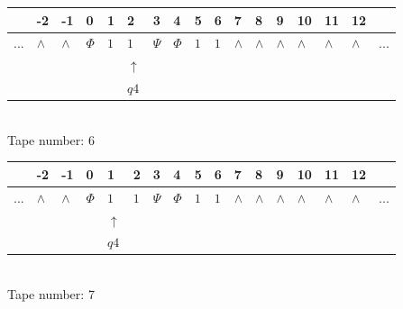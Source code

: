 \documentclass[11pt]{article}
\begin{document}
\begin{table}[H]
\centering
\begin{tabular}{lllllllllllllllll}
 & -2 & -1 & 0 & 1 & 2 & 3 & 4 & 5 & 6 & 7 & 8 & 9 & 10 & 11 & 12 & \\
\hline
$...$ & \multicolumn{1}{|l|}{$\wedge$} & \multicolumn{1}{|l|}{$\wedge$} & \multicolumn{1}{|l|}{$\Phi$} & \multicolumn{1}{|l|}{$1$} & \multicolumn{1}{|l|}{$1$} & \multicolumn{1}{|l|}{$\Psi$} & \multicolumn{1}{|l|}{$\Phi$} & \multicolumn{1}{|l|}{$1$} & \multicolumn{1}{|l|}{$1$} & \multicolumn{1}{|l|}{$\wedge$} & \multicolumn{1}{|l|}{$\wedge$} & \multicolumn{1}{|l|}{$\wedge$} & \multicolumn{1}{|l|}{$\wedge$} & \multicolumn{1}{|l|}{$\wedge$} & \multicolumn{1}{|l|}{$\wedge$} & $...$\\
\hline
&  &  &  &  & $\uparrow$ &  &  &  &  &  &  &  &  &  &  &  \\
&  &  &  &  & $ q4 $ &  &  &  &  &  &  &  &  &  &  &  \\
\end{tabular}
\\
Tape number: 6
\noindent\makebox[\linewidth]{\hdashrule{\textwidth}{1pt}{1pt}}\end{table}

\begin{table}[H]
\centering
\begin{tabular}{lllllllllllllllll}
 & -2 & -1 & 0 & 1 & 2 & 3 & 4 & 5 & 6 & 7 & 8 & 9 & 10 & 11 & 12 & \\
\hline
$...$ & \multicolumn{1}{|l|}{$\wedge$} & \multicolumn{1}{|l|}{$\wedge$} & \multicolumn{1}{|l|}{$\Phi$} & \multicolumn{1}{|l|}{$1$} & \multicolumn{1}{|l|}{$1$} & \multicolumn{1}{|l|}{$\Psi$} & \multicolumn{1}{|l|}{$\Phi$} & \multicolumn{1}{|l|}{$1$} & \multicolumn{1}{|l|}{$1$} & \multicolumn{1}{|l|}{$\wedge$} & \multicolumn{1}{|l|}{$\wedge$} & \multicolumn{1}{|l|}{$\wedge$} & \multicolumn{1}{|l|}{$\wedge$} & \multicolumn{1}{|l|}{$\wedge$} & \multicolumn{1}{|l|}{$\wedge$} & $...$\\
\hline
&  &  &  & $\uparrow$ &  &  &  &  &  &  &  &  &  &  &  &  \\
&  &  &  & $ q4 $ &  &  &  &  &  &  &  &  &  &  &  &  \\
\end{tabular}
\\
Tape number: 7
\noindent\makebox[\linewidth]{\hdashrule{\textwidth}{1pt}{1pt}}\end{table}
\end{document}

